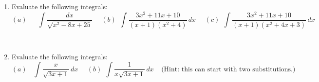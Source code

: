 \documentclass[11pt, oneside]{article}   	%
\title{}
\author{Week 7 discussion problems}
\date{}							%
\begin{document}
\maketitle

\begin{enumerate}

 
 \item Evaluate the following integrals:
$$  (a) \ \ \ \ \  \ \  \int\dfrac{dx}{\sqrt{x^2-8x+25}} \ \ \ \ \ \ (b) \ \  \int \dfrac{3x^2+11x+10}{(x+1)(x^2+4)} \, dx \ \ \ \ \ \ (c) \ \ \int \dfrac{3x^2+11x+10}{(x+1)(x^2+4x+3)}  \, dx$$

\


 \item Evaluate the following integrals:
$$(a) \ \  \ \  \int\dfrac{x}{\sqrt{3x+1}} \, dx  \ \ \ \  \ \ (b) \ \ \int \dfrac{1}{x \sqrt{3x+1}} \, dx \ \ \ \ \  \textrm{(Hint: this can start with two substitutions.)} $$

 
 \end{enumerate}
\end{document}
